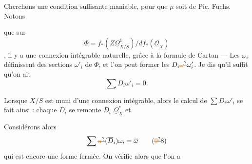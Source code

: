 Cherchons une condition suffisante maniable,    pour que $\mu$ soit de Pic. Fuchs. Notons

que  sur
\[
 \boxed{\Phi=f_*(Z\underline{\Omega}^{1}_{X/S})/d f_*(\underline{\mathcal O}_X)}
 \tag*{(6)}
\]
, il y a une connexion intégrable naturelle, grâce à la formule de Cartan --- Les $\omega_i$ définissent des sections $\omega'_i$ de $\Phi$, et l'on peut former les $D_i\deleted{\unsure{\omega}}\omega'_i$. Je dis qu'il suffit qu'on ait
\[
 \sum D_i\omega'_i=0.\tag*{(7)}
\]

Lorsque $X/S$ est muni d'une connexion intégrable, alors le calcul de $\sum D_i\omega'_i$ se fait ainsi :  chaque $D_i$ se remonte   $\overline D_i$  $\underline{\Omega}^*_X$  et 

\deleted{\[
\boxed{\begin{aligned}
 (8)\quad &\alpha_{\deleted{\unsure{D_i}}\overline D_i}\omega_i
 =\alpha_{\overline D_i^0}\omega_i+c_i\,\omega_i\\
 &\left\{\begin{aligned}
 \overline D_i&=\overline D_i^0+c_i\,\mathrm{id}
 &\left\{\begin{aligned}&\overline D_i^0\text{ à coeff. cts}\\
                         &c_i\text{ section de }\underline{\mathcal O}_X\end{aligned}\right.\\
 (9)\quad\alpha_{\overline D_i^0}\,d\varphi&=\deleted{\unsure{\alpha_i}}\overline D_i^0\varphi
 \end{aligned}\right.
\end{aligned}}
\]}

Considérons alors
\[
 \sum \deleted{\unsure{\alpha}}(\overline D_i)\omega_i=\overline\omega
 \tag*{(\deleted{\unsure{9}}8)}
\]
qui est encore une forme fermée. On vérifie alors  que l'on a

